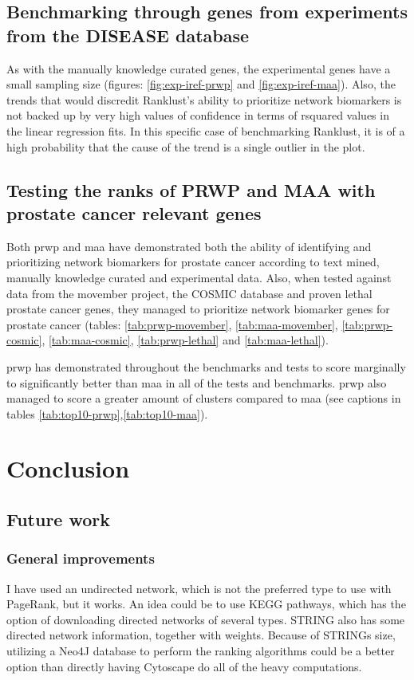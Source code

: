 \section{Benchmarking through genes from experiments from the DISEASE database}
As with the manually knowledge curated genes, the experimental genes have
a small sampling size (figures: \ref{fig:exp-iref-prwp} and
\ref{fig:exp-iref-maa}). Also, the trends that would discredit Ranklust's
ability to prioritize network biomarkers is not backed up by very high values of
confidence in terms of \gls{rsquared} values in the linear regression fits. In
this specific case of benchmarking Ranklust, it is of a high probability that
the cause of the trend is a single outlier in the plot.

\section{Testing the ranks of PRWP and MAA with prostate cancer relevant genes}
Both \gls{prwp} and \gls{maa} have demonstrated both the ability of identifying
and prioritizing network biomarkers for prostate cancer according to text mined,
manually knowledge curated and experimental data. Also, when tested against data
from the movember project, the COSMIC database and proven lethal prostate cancer
genes, they managed to prioritize network biomarker genes for prostate cancer
(tables: \ref{tab:prwp-movember}, \ref{tab:maa-movember}, \ref{tab:prwp-cosmic},
\ref{tab:maa-cosmic}, \ref{tab:prwp-lethal} and \ref{tab:maa-lethal}).

\gls{prwp} has demonstrated throughout the benchmarks and tests to score
marginally to significantly better than \gls{maa} in all of the tests and
benchmarks. \gls{prwp} also managed to score a greater amount of clusters
compared to \gls{maa} (see captions in tables
\ref{tab:top10-prwp},\ref{tab:top10-maa}).

\chapter{Conclusion}
\section{Future work}
\subsection{General improvements}
I have used an undirected network, which is not the preferred type to use with
PageRank, but it works. An idea could be to use KEGG pathways\cite{kegg}, which
has the option of downloading directed networks of several types.
STRING\cite{str} also has some directed network information, together with
weights. Because of STRINGs size, utilizing a Neo4J database to perform the
ranking algorithms could be a better option than directly having Cytoscape do
all of the heavy computations.

